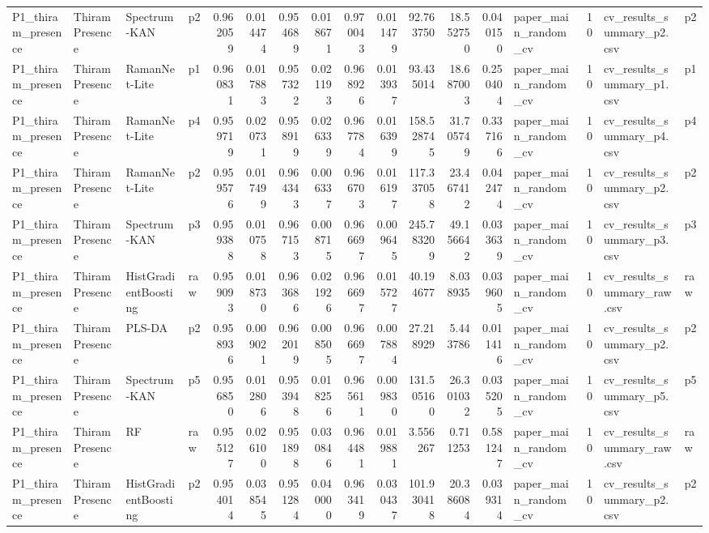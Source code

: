 \begin{tabular}{llllrrrrrrrrrlrll}
P1_thiram_presence & Thiram Presence & Spectrum-KAN & p2 & 0.962059 & 0.014474 & 0.954689 & 0.018671 & 0.970043 & 0.011479 & 92.763750 & 18.552750 & 0.040150 & paper_main_random_cv & 10 & cv_results_summary_p2.csv & p2 \\
P1_thiram_presence & Thiram Presence & RamanNet-Lite & p1 & 0.960831 & 0.017883 & 0.957322 & 0.021193 & 0.968926 & 0.013937 & 93.435014 & 18.687003 & 0.250404 & paper_main_random_cv & 10 & cv_results_summary_p1.csv & p1 \\
P1_thiram_presence & Thiram Presence & RamanNet-Lite & p4 & 0.959719 & 0.020731 & 0.958919 & 0.026339 & 0.967784 & 0.016399 & 158.528745 & 31.705749 & 0.337166 & paper_main_random_cv & 10 & cv_results_summary_p4.csv & p4 \\
P1_thiram_presence & Thiram Presence & RamanNet-Lite & p2 & 0.959576 & 0.017499 & 0.964343 & 0.006337 & 0.966703 & 0.016197 & 117.337058 & 23.467412 & 0.042474 & paper_main_random_cv & 10 & cv_results_summary_p2.csv & p2 \\
P1_thiram_presence & Thiram Presence & Spectrum-KAN & p3 & 0.959388 & 0.010758 & 0.967153 & 0.008715 & 0.966697 & 0.009645 & 245.783209 & 49.156642 & 0.033639 & paper_main_random_cv & 10 & cv_results_summary_p3.csv & p3 \\
P1_thiram_presence & Thiram Presence & HistGradientBoosting & raw & 0.959093 & 0.018730 & 0.963686 & 0.021926 & 0.966697 & 0.015727 & 40.194677 & 8.038935 & 0.039605 & paper_main_random_cv & 10 & cv_results_summary_raw.csv & raw \\
P1_thiram_presence & Thiram Presence & PLS-DA & p2 & 0.958936 & 0.009021 & 0.962019 & 0.008505 & 0.966697 & 0.007884 & 27.218929 & 5.443786 & 0.011416 & paper_main_random_cv & 10 & cv_results_summary_p2.csv & p2 \\
P1_thiram_presence & Thiram Presence & Spectrum-KAN & p5 & 0.956850 & 0.012806 & 0.953948 & 0.018256 & 0.965611 & 0.009830 & 131.505160 & 26.301032 & 0.035205 & paper_main_random_cv & 10 & cv_results_summary_p5.csv & p5 \\
P1_thiram_presence & Thiram Presence & RF & raw & 0.955127 & 0.026100 & 0.951898 & 0.030846 & 0.964481 & 0.019881 & 3.556267 & 0.711253 & 0.581247 & paper_main_random_cv & 10 & cv_results_summary_raw.csv & raw \\
P1_thiram_presence & Thiram Presence & HistGradientBoosting & p2 & 0.954014 & 0.038545 & 0.951284 & 0.040000 & 0.963419 & 0.030437 & 101.930418 & 20.386084 & 0.039314 & paper_main_random_cv & 10 & cv_results_summary_p2.csv & p2 \\

\end{tabular}
